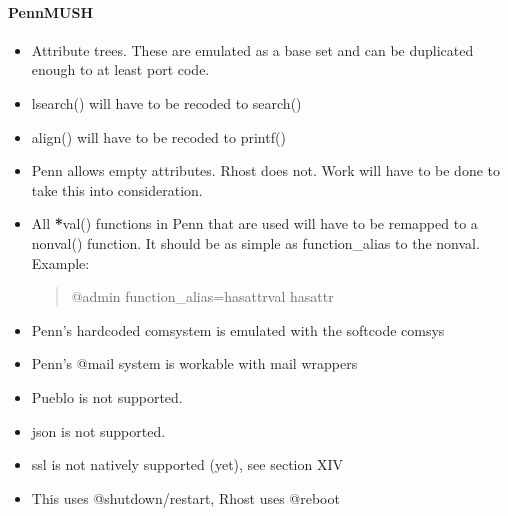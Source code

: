 \documentclass[letterpaper,10pt,english]{sphinxmanual}
\begin{document}
\paragraph{PennMUSH}
\label{\detokenize{features:pennmush}}\begin{itemize}
\item {} 
\sphinxAtStartPar
Attribute trees.  These are emulated as a base set and can be
duplicated enough to at least port code.

\item {} 
\sphinxAtStartPar
lsearch() will have to be recoded to search()

\item {} 
\sphinxAtStartPar
align() will have to be recoded to printf()

\item {} 
\sphinxAtStartPar
Penn allows empty attributes.  Rhost does not.  Work will have to
be done to take this into consideration.

\item {} 
\sphinxAtStartPar
All {\color{red}\bfseries{}*}val() functions in Penn that are used will have to be
remapped to a non\sphinxhyphen{}{\color{red}\bfseries{}*}val() function.  It should be as simple as
function\_alias to the non\sphinxhyphen{}{\color{red}\bfseries{}*}val.  Example:
\begin{quote}

\sphinxAtStartPar
@admin function\_alias=hasattrval hasattr
\end{quote}

\item {} 
\sphinxAtStartPar
Penn’s hardcoded comsystem is emulated with the softcode comsys

\item {} 
\sphinxAtStartPar
Penn’s @mail system is workable with mail wrappers

\item {} 
\sphinxAtStartPar
Pueblo is not supported.

\item {} 
\sphinxAtStartPar
json is not supported.

\item {} 
\sphinxAtStartPar
ssl is not natively supported (yet), see section XIV

\item {} 
\sphinxAtStartPar
This uses @shutdown/restart, Rhost uses @reboot

\end{itemize}
\end{document}
